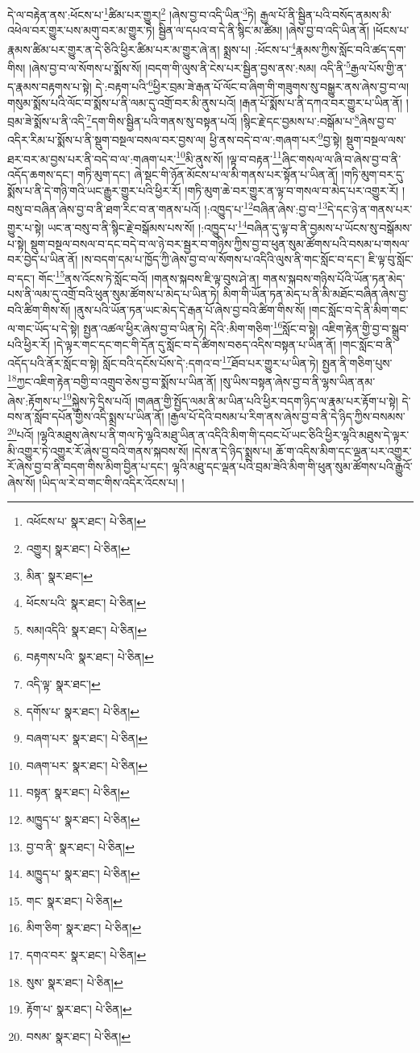 དེ་ལ་བརྟེན་ནས་:ཕོངས་པ་\footnote{འཕོངས་པ་  སྣར་ཐང་།  པེ་ཅིན། }ཚིམ་པར་གྱུར།\footnote{འགྱུར།  སྣར་ཐང་།  པེ་ཅིན། } །ཞེས་བྱ་བ་འདི་ཡིན་\footnote{མིན་  སྣར་ཐང་། }ཏེ། རྒྱལ་པོ་ནི་སྦྱིན་པའི་བསོད་ནམས་མི་འཕེལ་བར་གྱུར་པས་མགུ་བར་མ་གྱུར་ཏེ། སྦྱིན་ལ་དཔའ་བ་དེ་ནི་སྙིང་མ་ཚིམ། །ཞེས་བྱ་བ་འདི་ཡིན་ནོ། །ཕོངས་པ་རྣམས་ཚིམ་པར་གྱུར་ན་དེ་ཅིའི་ཕྱིར་ཚིམ་པར་མ་གྱུར་ཞེ་ན། སྨྲས་པ། :ཕོངས་པ་\footnote{ཕོངས་པའི་  སྣར་ཐང་།  པེ་ཅིན། }རྣམས་ཀྱིས་སློང་བའི་ཚད་དག་གིས། །ཞེས་བྱ་བ་ལ་སོགས་པ་སྨོས་སོ། །བདག་གི་ལུས་ནི་ངེས་པར་སྦྱིན་བྱས་ནས་:སམ། འདི་ནི་\footnote{སམ།འདིའི་  སྣར་ཐང་།  པེ་ཅིན། }རྒྱལ་པོས་གྱི་ན་ད་རྣམས་བརྟགས་པ་སྟེ། དེ་:བརྟག་པའི་\footnote{བརྟགས་པའི་  སྣར་ཐང་།  པེ་ཅིན། }ཕྱིར་བྲམ་ཟེ་རྒན་པོ་ལོང་བ་ཞིག་གི་གཟུགས་སུ་བསྒྱུར་ནས་ཞེས་བྱ་བ་ལ། གསུམ་སྨོས་པའི་ལོང་བ་སྨོས་པ་ནི་ལམ་དུ་འགྲོ་བར་མི་ནུས་པའོ། །རྒན་པོ་སྨོས་པ་ནི་དཀའ་བར་གྱུར་པ་ཡིན་ནོ། །བྲམ་ཟེ་སྨོས་པ་ནི་འདི་\footnote{འདི་ལྟ་  སྣར་ཐང་། }དག་གིས་སྦྱིན་པའི་གནས་སུ་བསྟན་པའོ། །སྙིང་རྗེ་དང་བྱམས་པ་:བསྒོམ་པ་\footnote{དགོས་པ་  སྣར་ཐང་།  པེ་ཅིན། }ཞེས་བྱ་བ་འདིར་རིམ་པ་སྨོས་པ་ནི་སྡུག་བསྔལ་བསལ་བར་བྱས་ལ། ཕྱི་ནས་བདེ་བ་ལ་:གཞག་པར་\footnote{བཞག་པར་  སྣར་ཐང་།  པེ་ཅིན། }བྱ་སྟེ། སྡུག་བསྔལ་ལས་ཐར་བར་མ་བྱས་པར་ནི་བདེ་བ་ལ་:གཞག་པར་\footnote{བཞག་པར་  སྣར་ཐང་།  པེ་ཅིན། }མི་ནུས་སོ། །ལྟ་བ་བརྟན་\footnote{བསྟན་  སྣར་ཐང་།  པེ་ཅིན། }ཞིང་གསལ་ལ་ཞི་བ་ཞེས་བྱ་བ་ནི་འདོད་ཆགས་དང་། གཏི་མུག་དང་། ཞེ་སྡང་གི་ཉོན་མོངས་པ་ལ་མི་གནས་པར་སྟོན་པ་ཡིན་ནོ། །གཏི་མུག་བར་དུ་སྨོས་པ་ནི་དེ་གཉི་གའི་ཡང་རྒྱུར་གྱུར་པའི་ཕྱིར་རོ། །གཏི་མུག་ཆེ་བར་གྱུར་ན་ལྟ་བ་གསལ་བ་མེད་པར་འགྱུར་རོ། །བསུ་བ་བཞིན་ཞེས་བྱ་བ་ནི་ཐག་རིང་བ་ན་གནས་པའོ། །:འཁྱུད་པ་\footnote{མཁྱུད་པ་  སྣར་ཐང་།  པེ་ཅིན། }བཞིན་ཞེས་:བྱ་བ་\footnote{བྱ་བ་ནི་  སྣར་ཐང་།  པེ་ཅིན། }དེ་དང་ཉེ་ན་གནས་པར་གྱུར་པ་སྟེ། ཡང་ན་བསུ་བ་ནི་སྙིང་རྗེ་བསྒོམས་པས་སོ། །:འཁྱུད་པ་\footnote{མཁྱུད་པ་  སྣར་ཐང་།  པེ་ཅིན། }བཞིན་དུ་ལྟ་བ་ནི་བྱམས་པ་ཡོངས་སུ་བསྒོམས་པ་སྟེ། སྡུག་བསྔལ་བསལ་བ་དང་བདེ་བ་ལ་ཉེ་བར་སྦྱར་བ་གཉིས་ཀྱིས་བྱ་བ་ཕུན་སུམ་ཚོགས་པའི་བསམ་པ་གསལ་བར་བྱེད་པ་ཡིན་ནོ། །ས་བདག་དམ་པ་ཁྱོད་ཀྱི་ཞེས་བྱ་བ་ལ་སོགས་པ་འདིའི་ལུས་ནི་གང་སློང་བ་དང་། ཇི་ལྟ་བུ་སློང་བ་དང་། གོང་\footnote{གང་  སྣར་ཐང་།  པེ་ཅིན། }ནས་འོངས་ཏེ་སློང་བའོ། །གནས་སྐབས་ཇི་ལྟ་བུས་ཤེ་ན། གནས་སྐབས་གཉིས་པོའི་ཡོན་ཏན་མེད་པས་ནི་ལམ་དུ་འགྲོ་བའི་ཕུན་སུམ་ཚོགས་པ་མེད་པ་ཡིན་ཏེ། མིག་གི་ཡོན་ཏན་མེད་པ་ནི་མི་མཐོང་བཞིན་ཞེས་བྱ་བའི་ཚིག་གིས་སོ། །ནུས་པའི་ཡོན་ཏན་ཡང་མེད་དེ་རྒན་པོ་ཞེས་བྱ་བའི་ཚིག་གིས་སོ། །གང་སློང་བ་དེ་ནི་མིག་གང་ལ་གང་ཡོད་པ་དེ་སྟེ། སྤྱན་འཚལ་ཕྱིར་ཞེས་བྱ་བ་ཡིན་ཏེ། དེའི་:མིག་གཅིག་\footnote{མིག་ཅིག་  སྣར་ཐང་།  པེ་ཅིན། }སློང་བ་སྟེ། འཇིག་རྟེན་གྱི་བྱ་བ་སྒྲུབ་པའི་ཕྱིར་རོ། །དེ་ལྟར་གང་དང་གང་གི་དོན་དུ་སློང་བ་དེ་ཚིགས་བཅད་འདིས་བསྟན་པ་ཡིན་ནོ། །གང་སློང་བ་ནི་འདོད་པའི་ནོར་སློང་བ་སྟེ། སློང་བའི་དངོས་པོས་དེ་:དགའ་བ་\footnote{དགའ་བར་  སྣར་ཐང་།  པེ་ཅིན། }ཐོབ་པར་གྱུར་པ་ཡིན་ཏེ། སྤྱན་ནི་གཅིག་པུས་\footnote{སུས་  སྣར་ཐང་།  པེ་ཅིན། }ཀྱང་འཇིག་རྟེན་བགྱི་བ་འགྲུབ་ཅེས་བྱ་བ་སྨོས་པ་ཡིན་ནོ། །སུ་ཡིས་བསྟན་ཞེས་བྱ་བ་ནི་ལྷས་ཡིན་ནམ་ཞེས་:རྟོགས་པ་\footnote{རྟོག་པ་  སྣར་ཐང་།  པེ་ཅིན། }སྐྱེས་ཏེ་དྲིས་པའོ། །གཞན་གྱི་སྤྱོད་ལམ་ནི་མ་ཡིན་པའི་ཕྱིར་བདག་ཉིད་ལ་རྣམ་པར་རྟོག་པ་སྟེ། དེ་བས་ན་སློབ་དཔོན་གྱིས་འདི་སྨྲས་པ་ཡིན་ནོ། །རྒྱལ་པོ་དེའི་བསམ་པ་རིག་ནས་ཞེས་བྱ་བ་ནི་དེ་ཉིད་ཀྱིས་བསམས་\footnote{བསམ་  སྣར་ཐང་།  པེ་ཅིན། }པའོ། །ལྷའི་མཐུས་ཞེས་པ་ནི་གལ་ཏེ་ལྷའི་མཐུ་ཡིན་ན་འདིའི་མིག་གི་དབང་པོ་ཡང་ཅིའི་ཕྱིར་ལྷའི་མཐུས་དེ་ལྟར་མི་འགྱུར་ཏེ་འགྱུར་རོ་ཞེས་བྱ་བའི་གནས་སྐབས་སོ། །དེས་ན་དེ་ཉིད་སྨྲས་པ། ཆོ་ག་འདིས་མིག་དང་ལྡན་པར་འགྱུར་རོ་ཞེས་བྱ་བ་ནི་བདག་གིས་མིག་བྱིན་པ་དང་། ལྷའི་མཐུ་དང་ལྡན་པའི་བྲམ་ཟེའི་མིག་གི་ཕུན་སུམ་ཚོགས་པའི་རྒྱུའོ་ཞེས་སོ། །ཡིད་ལ་རེ་བ་གང་གིས་འདིར་འོངས་པ། །
